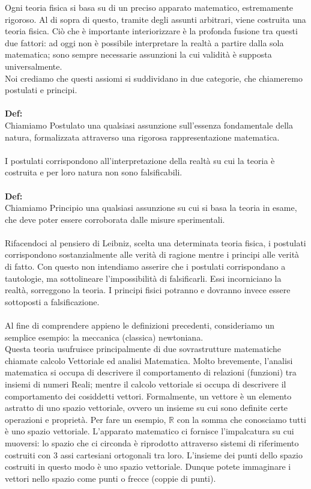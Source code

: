 \documentclass[]{article}
\begin{document}
	Ogni teoria fisica si basa su di un preciso apparato matematico, estremamente rigoroso. Al di sopra di questo, tramite degli assunti arbitrari, viene costruita una teoria fisica. Ciò che è importante interiorizzare è la profonda fusione tra questi due fattori: ad oggi non è possibile interpretare la realtà a partire dalla sola matematica; sono sempre necessarie assunzioni la cui validità è supposta universalmente.\\
	Noi crediamo che questi assiomi si suddividano in due categorie, che chiameremo postulati e principi.\\
	\\
	\textbf{Def:}\\
	Chiamiamo Postulato una qualsiasi assunzione sull'essenza fondamentale della natura, formalizzata attraverso una rigorosa rappresentazione matematica.
	\\
	\\
	I postulati corrispondono all'interpretazione della realtà su cui la teoria è costruita e per loro natura non sono falsificabili.
	\\\\
	\textbf{Def:}\\
	Chiamiamo Principio una qualsiasi assunzione su cui si basa la teoria in esame, che deve poter essere corroborata dalle misure sperimentali.
	\\
	\\
	Rifacendoci al pensiero di Leibniz, scelta una determinata teoria fisica, i postulati corrispondono sostanzialmente alle verità di ragione mentre i principi alle verità di fatto. Con questo non intendiamo asserire che i postulati corrispondano a tautologie, ma sottolineare l'impossibilità di falsificarli. Essi incorniciano la realtà, sorreggono la teoria. I principi fisici potranno e dovranno invece essere sottoposti a falsificazione.\\
	\\
	Al fine di comprendere appieno le definizioni precedenti, consideriamo un semplice esempio: la meccanica (classica) newtoniana.\\
	Questa teoria usufruisce principalmente di due sovrastrutture matematiche chiamate calcolo Vettoriale ed analisi Matematica. Molto brevemente, l'analisi matematica si occupa di descrivere il comportamento di relazioni (funzioni) tra insiemi di numeri Reali; mentre il calcolo vettoriale si occupa di descrivere il comportamento dei cosiddetti vettori. Formalmente, un vettore è un elemento astratto di uno spazio vettoriale, ovvero un insieme su cui sono definite certe operazioni e proprietà. Per fare un esempio, $\mathbb{R}$ con la somma che conosciamo tutti è uno spazio vettoriale. L'apparato matematico ci fornisce l'impalcatura su cui muoversi: lo spazio che ci circonda è riprodotto attraverso sistemi di riferimento costruiti con 3 assi cartesiani ortogonali tra loro. L'insieme dei punti dello spazio costruiti in questo modo è uno spazio vettoriale. Dunque potete immaginare i vettori nello spazio come punti o frecce (coppie di punti). \\
\end{document}
